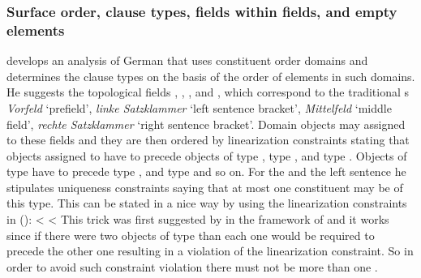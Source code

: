 \documentclass[output=paper]{langsci/langscibook}
\begin{document}
\subsubsection{Surface order, clause types, fields within fields, and empty elements}
\label{sec-surface-order}

\citet{Kathol2001a} develops an analysis of German that uses constituent order domains and determines the
clause types on the basis of the order of elements in such domains. He suggests the topological
fields , , , and , which correspond to the traditional
s \emph{Vorfeld} `prefield', \emph{linke Satzklammer} `left sentence
bracket', \emph{Mittelfeld} `middle field', \emph{rechte Satzklammer} `right sentence
bracket'. Domain objects may assigned to these fields and they are then ordered by linearization
constraints stating that objects assigned to  have to precede objects of type ,
type , and type . Objects of type  have to precede type , and type
 and so on. For the \vf and the left sentence he stipulates uniqueness constraints saying
that at most one constituent may be of this type. This can be stated in a nice way by using
the linearization constraints in ():
\eal
\ex {} < 
\ex {} < 
\zl
This trick was first suggested by \citet[, Fn.\,3]{GKPS85a} in the framework of  and it works
since if there were two objects of type  than each one would be required to precede the
other one resulting in a violation of the linearization constraint. So in order to avoid such
constraint violation there must not be more than one .
\end{document}
